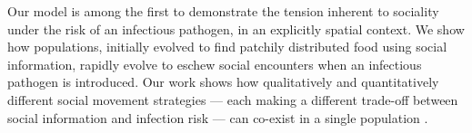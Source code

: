 
Our model is among the first to demonstrate the tension inherent to sociality under the risk of an infectious pathogen, in an explicitly spatial context.
We show how populations, initially evolved to find patchily distributed food using social information, rapidly evolve to eschew social encounters when an infectious pathogen is introduced.
Our work shows how qualitatively and quantitatively different social movement strategies --- each making a different trade-off between social information and infection risk --- can co-exist in a single population \citep{gartland2021}.


